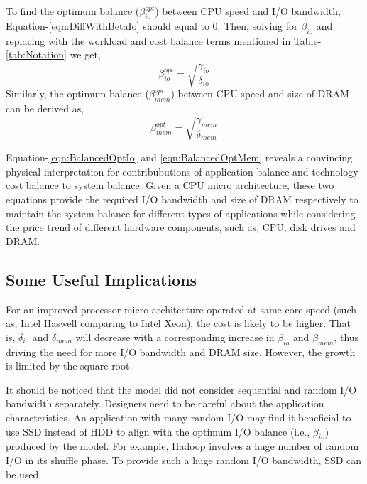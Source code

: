 \documentclass[journal]{IEEEtran}
\begin{document}
To find the optimum balance ($\beta_{io}^{opt}$) between CPU speed and I/O bandwidth, Equation-\ref{eqn:DiffWithBetaIo} should equal to $0$. Then,  solving for $\beta_{io}$ and replacing with the workload and cost balance terms mentioned in Table-\ref{tab:Notation} we get,
\begin{equation} \label{eqn:BalancedOptIo}
\beta^{opt}_{io} = \sqrt{\frac{\gamma_{io}}{\delta_{io}}}
\end{equation}
Similarly, the optimum balance ($\beta_{mem}^{opt}$) between CPU speed and size of DRAM can be derived as, 
\begin{equation} \label{eqn:BalancedOptMem}
\beta^{opt}_{mem} = \sqrt{\frac{\gamma_{mem}}{\delta_{mem}}}
\end{equation}

Equation-\ref{eqn:BalancedOptIo} and \ref{eqn:BalancedOptMem} reveals a convincing physical interpretation for contribubutions of application balance and technology-cost balance to system balance. Given a CPU micro architecture, these two equations provide the required I/O bandwidth and size of DRAM respectively to maintain the system balance for different types of applications while considering the price trend of different hardware components, such as, CPU, disk drives and DRAM.

\subsection{Some Useful Implications}
For an improved processor micro architecture operated at same core speed (such as, Intel Haswell comparing to Intel Xeon), the cost is likely to be higher. That is, $\delta_{io}$ and $\delta_{mem}$ will decrease with a corresponding increase in $\beta_{io}$ and $\beta_{mem}$, thus driving the need for more I/O bandwidth and DRAM size. However, the growth is limited by the square root.

It should be noticed that the model did not consider sequential and random I/O bandwidth separately. Designers need to be careful about the application characteristics. An application with many random I/O may find it beneficial to use SSD instead of HDD to align with the optimum I/O balance (i.e., $\beta_{io}$) produced by the model. For example, Hadoop involves a huge number of random I/O  in its shuffle phase. To provide such a huge random I/O bandwidth, SSD can be used.
\end{document}
